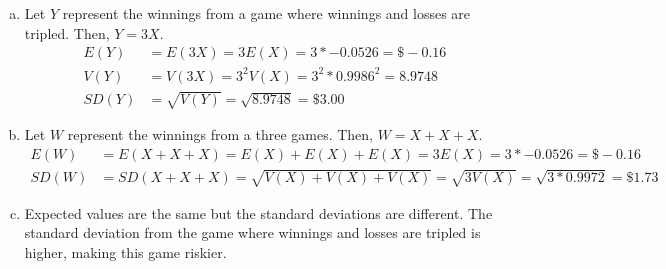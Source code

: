 {
\begin{enumerate}[(a)]
\item Let $Y$ represent the winnings from a game where winnings and losses are tripled. Then, $Y = 3X$.
\begin{align*}
E(Y) &= E(3X) = 3 E(X) = 3 * -0.0526 = \$-0.16 \\
V(Y) &= V(3X) = 3^2 V(X) = 3^2 * 0.9986^2 = 8.9748 \\
SD(Y) &= \sqrt{V(Y)} = \sqrt{8.9748} = \$3.00
\end{align*}
\item Let $W$ represent the winnings from a three games. Then, $W = X + X + X$.
\begin{align*}
E(W) &= E(X + X + X) = E(X) +E(X) + E(X) = 3 E(X) = 3 * -0.0526 = \$-0.16 \\
SD(W) &= SD(X + X + X) = \sqrt{V(X) + V(X) + V(X)} = \sqrt{3 V(X)} = \sqrt{3 * 0.9972} = \$1.73
\end{align*}
\item Expected values are the same but the standard deviations are different. The standard deviation from the game where winnings and losses are tripled is higher, making this game riskier.
\end{enumerate}
}

%

